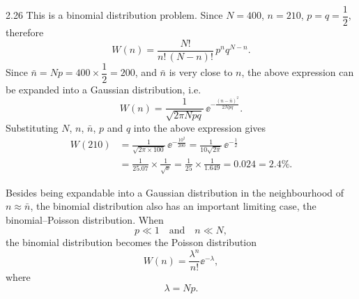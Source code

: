 \begin{solution}{2.26}
This is a binomial distribution problem. Since $N=400$, $n=210$, $p=q=\dfrac{1}{2}$, therefore
\begin{equation*}
W(n) = \frac{N!}{n!\,(N-n)!}\,p^nq^{N-n}.
\end{equation*}
Since $\bar{n}=Np=400\times\dfrac{1}{2}=200$, and $\bar{n}$ is very close to $n$, the above
expression can be expanded into a Gaussian distribution, i.e.
\begin{equation*}
W(n) = \frac{1}{\sqrt{2\pi Npq}}\,\ee^{-\frac{(n-\bar{n})^2}{2Npq}}.
\end{equation*}
Substituting $N$, $n$, $\bar{n}$, $p$ and $q$ into the above expression gives
\begin{align*}
W(210) &= \frac{1}{\sqrt{2\pi\times 100}}\,\ee^{-\frac{10^2}{200}}
= \frac{1}{10\sqrt{2\pi}}\,\ee^{-\frac{1}{2}}\\
&= \frac{1}{25.07}\times\frac{1}{\sqrt{\ee}}
= \frac{1}{25}\times\frac{1}{1.649} = 0.024 = 2.4\% .
\end{align*}

\begin{commentary}
Besides being expandable into a Gaussian distribution in the neighbourhood of $n\approx\bar{n}$,
the binomial distribution also has an important limiting case, the binomial--Poisson
distribution. When
\begin{equation*}
p\ll 1\quad\text{and}\quad n\ll N,
\end{equation*}
the binomial distribution becomes the Poisson distribution
\begin{equation*}
W(n) = \frac{\lambda^n}{n!}\ee^{-\lambda},
\end{equation*}
where
\begin{equation*}
\lambda = Np .
\end{equation*}
\end{commentary}
\end{solution}

